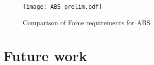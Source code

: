 \documentclass[main.tex]{subfiles}
\begin{document}
\begin{figure}[!htbp]
	\center
	\texttt{[image: ABS\_prelim.pdf]}
	\caption{Comparison of Force requirements for ABS} \label{fig:absprelim}
\end{figure}

\section{Future work} \label{sec:fw}



% 

\end{document}

